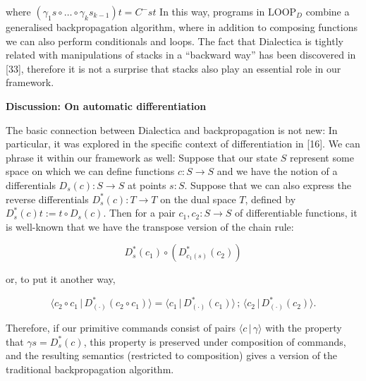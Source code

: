 \documentclass[10pt,a4paper]{article}
\begin{document}
where $(\gamma_{1}s\circ\ldots\circ\gamma_{k}s_{k-1})t=C^{-}st$ In this way, programs in $\mathrm{LOOP}_{D}$ combine a generalised backpropagation algorithm, where in addition to composing functions we can also perform conditionals and loops. The fact that Dialectica is tightly related with manipulations of stacks in a “backward way” has been discovered in [33], therefore it is not a surprise that stacks also play an essential role in our framework.\par
 
 
 
 
\par\medskip\noindent\textbf{Discussion: On automatic differentiation}\par
 
 
The basic connection between Dialectica and backpropagation is not new: In particular, it was explored in the specific context of differentiation in [16]. We can phrase it within our framework as well: Suppose that our state $S$ represent some space on which we can define functions $c:S\to S$ and we have the notion of a differentials $D_{s}({c}):S\to S$ at points $s:S$. Suppose that we can also express the reverse differentials $D^{\ast}_{s}({c}):T\to T$ on the dual space $T$, defined by $D^{\ast}_{s}({c})t:=t\circ D_{s}({c})$. Then for a pair $c_{1},c_{2}:S\to S$ of differentiable functions, it is well-known that we have the transpose version of the chain rule:\par
  
\par  \quad  \[D^{\ast}_{s}({c_{1}})\circ\left(D^{\ast}_{c_{1}(s)}({c_{2}})\right)\]\quad  \quad  
  
or, to put it another way,\par
  
\par  \quad  \[\langle{c_{2}\circ c_{1}}\,|\,{D^{\ast}_{(\cdot)}({c_{2}\circ c_{1}})}\rangle={\langle{c_{1}}\,|\,{D^{\ast}_{(\cdot)}({c_{1}})}\rangle}\,;\,{\langle{c_{2}}\,|\,{D^{\ast}_{(\cdot)}({c_{2}})}\rangle}.\]\quad  \quad  
  
Therefore, if our primitive commands consist of pairs $\langle{c}\,|\,{\gamma}\rangle$ with the property that $\gamma s=D^{\ast}_{s}({c})$, this property is preserved under composition of commands, and the resulting semantics (restricted to composition) gives a version of the traditional backpropagation algorithm.\par
 
\end{document}
